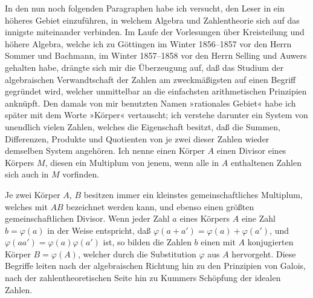 \documentclass[11pt]{article}
\newcommand{\origpage}[1]{\par\vspace{0.25em}\noindent{\footnotesize\itshape [Gedruckte Seite #1]}\par\vspace{0.25em}}
\begin{document}
In den nun noch folgenden Paragraphen habe ich versucht, den Leser in ein höheres Gebiet einzuführen, in welchem Algebra und Zahlentheorie sich auf das innigste miteinander verbinden. Im Laufe der Vorlesungen über Kreisteilung und höhere Algebra, welche ich zu Göttingen im Winter 1856--1857 vor den Herrn Sommer und Bachmann, im Winter 1857--1858 vor den Herrn Selling und Auwers gehalten habe, drängte sich mir die Überzeugung auf, daß das Studium der algebraischen Verwandtschaft der Zahlen am zweckmäßigsten auf einen Begriff gegründet wird, welcher unmittelbar an die einfachsten arithmetischen Prinzipien anknüpft. Den damals von mir benutzten Namen »rationales Gebiet« habe ich später mit dem Worte »Körper« vertauscht; ich verstehe darunter ein System von unendlich vielen Zahlen, welches die Eigenschaft besitzt, daß die Summen, Differenzen, Produkte und Quotienten von je zwei dieser Zahlen wieder demselben System angehören. Ich nenne einen Körper $A$ einen Divisor eines Körpers $M$, diesen ein Multiplum von jenem, wenn alle in $A$ enthaltenen Zahlen sich auch in $M$ vorfinden.

\origpage{401}
Je zwei Körper $A$, $B$ besitzen immer ein kleinstes gemeinschaftliches Multiplum, welches mit $AB$ bezeichnet werden kann, und ebenso einen größten gemeinschaftlichen Divisor. Wenn jeder Zahl $a$ eines Körpers $A$ eine Zahl $b=\varphi(a)$ in der Weise entspricht, daß $\varphi(a+a')=\varphi(a)+\varphi(a')$, und $\varphi(aa')=\varphi(a)\varphi(a')$ ist, so bilden die Zahlen $b$ einen mit $A$ konjugierten Körper $B=\varphi(A)$, welcher durch die Substitution $\varphi$ aus $A$ hervorgeht. Diese Begriffe leiten nach der algebraischen Richtung hin zu den Prinzipien von Galois, nach der zahlentheoretischen Seite hin zu Kummers Schöpfung der idealen Zahlen.
\end{document}
